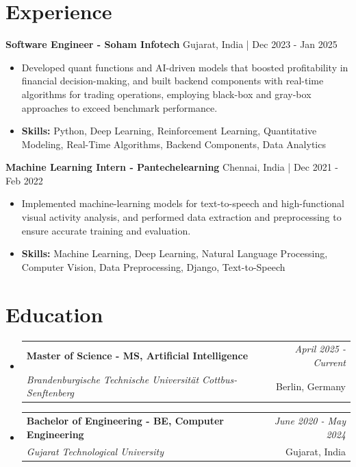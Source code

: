 \documentclass[a4paper,11pt]{article}
\makeatletter
\newcommand{\resumeSubheading}[4]{
\vspace{0.5mm}\item
    \begin{tabular*}{\linewidth}[t]{l@{\extracolsep{\fill}}r}
        \textbf{#1} & \textit{\footnotesize{#4}} \\
        \textit{\footnotesize{#3}} &  \footnotesize{#2}\\
    \end{tabular*}
    \vspace{-2.4mm}
}
\makeatother
\begin{document}
\section{\textbf{Experience}}


\vspace{1mm}
  \textbf{Software Engineer - Soham Infotech} \hfill Gujarat, India | Dec 2023 - Jan 2025
\vspace{-1.5mm} %
\begin{itemize}
  \item Developed quant functions and AI-driven models that boosted profitability in financial decision-making, and built backend components with real-time algorithms for trading operations, employing black-box and gray-box approaches to exceed benchmark performance.

\vspace{-2mm}
  \item \textbf{Skills:} Python, Deep Learning, Reinforcement Learning, Quantitative Modeling, Real-Time Algorithms, Backend Components, Data Analytics
\end{itemize}

\vspace{1mm}
  \textbf{Machine Learning Intern - Pantechelearning} \hfill Chennai, India | Dec 2021 - Feb 2022
\vspace{-1.5mm} %
\begin{itemize}
  \item Implemented machine-learning models for text-to-speech and high-functional visual activity analysis, and performed data extraction and preprocessing to ensure accurate training and evaluation.
\vspace{-2mm}
  \item \textbf{Skills:} Machine Learning, Deep Learning, Natural Language Processing, Computer Vision, Data Preprocessing, Django, Text-to-Speech
\end{itemize}\section{\textbf{Education}}
\vspace{-0.4mm}

\begin{itemize}[leftmargin=0.15in, label={}]
\resumeSubheading
{Master of Science - MS, Artificial Intelligence }{Berlin, Germany}
{Brandenburgische Technische Universität Cottbus-Senftenberg  }{April 2025 - Current}

\vspace{1.0mm} %
\resumeSubheading
{Bachelor of Engineering - BE, Computer Engineering  }{Gujarat, India}
{Gujarat Technological University }{June 2020 - May 2024}

\end{itemize}
\end{document}
